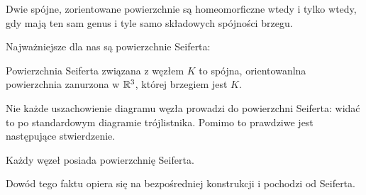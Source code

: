 \begin{proposition}
    Dwie spójne, zorientowane powierzchnie są homeomorficzne wtedy i tylko
    wtedy, gdy mają ten sam genus i tyle samo składowych spójności brzegu.
\end{proposition}

Najważniejsze dla nas są powierzchnie Seiferta:

\begin{definition} 
    Powierzchnia Seiferta związana z węzłem $K$ to spójna,
    orientowanlna powierzchnia zanurzona w $\mathbb R^3$, której brzegiem jest $K$.
\end{definition}


Nie każde uszachowienie diagramu węzła prowadzi do powierzchni Seiferta:
widać to po standardowym diagramie trójlistnika.
Pomimo to prawdziwe jest następujące stwierdzenie.

\begin{proposition}
    Każdy węzeł posiada powierzchnię Seiferta.
\end{proposition}

Dowód tego faktu opiera się na bezpośredniej konstrukcji i pochodzi od Seiferta.

